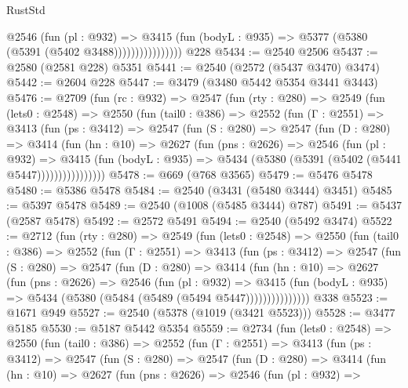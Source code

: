 \begin{lexlean}{RustStd}
\begin{coremodule}
                        @2546
                          (fun (pl : @932) =>
                          @3415
                            (fun (bodyL : @935) => @5377 (@5380 (@5391 (@5402 @3488))))))))))))))))
    @228
@5434 := @2540 @2506
@5437 := @2580 (@2581 @228) @5351
@5441 := @2540 (@2572 (@5437 @3470) @3474)
@5442 := @2604 @228
@5447 := @3479 (@3480 @5442 @5354 @3441 @3443)
@5476 := @2709
    (fun (rc : @932) =>
    @2547
      (fun (rty : @280) =>
      @2549
        (fun (lets0 : @2548) =>
        @2550
          (fun (tail0 : @386) =>
          @2552
            (fun (Γ : @2551) =>
            @3413
              (fun (ps : @3412) =>
              @2547
                (fun (S : @280) =>
                @2547
                  (fun (D : @280) =>
                  @3414
                    (fun (hn : @10) =>
                    @2627
                      (fun (pns : @2626) =>
                      @2546
                        (fun (pl : @932) =>
                        @3415
                          (fun (bodyL : @935) =>
                          @5434 (@5380 (@5391 (@5402 (@5441 @5447))))))))))))))))
@5478 := @669 (@768 @3565)
@5479 := @5476 @5478
@5480 := @5386 @5478
@5484 := @2540 (@3431 (@5480 @3444) @3451)
@5485 := @5397 @5478
@5489 := @2540 (@1008 (@5485 @3444) @787)
@5491 := @5437 (@2587 @5478)
@5492 := @2572 @5491
@5494 := @2540 (@5492 @3474)
@5522 := @2712
    (fun (rty : @280) =>
    @2549
      (fun (lets0 : @2548) =>
      @2550
        (fun (tail0 : @386) =>
        @2552
          (fun (Γ : @2551) =>
          @3413
            (fun (ps : @3412) =>
            @2547
              (fun (S : @280) =>
              @2547
                (fun (D : @280) =>
                @3414
                  (fun (hn : @10) =>
                  @2627
                    (fun (pns : @2626) =>
                    @2546
                      (fun (pl : @932) =>
                      @3415
                        (fun (bodyL : @935) =>
                        @5434 (@5380 (@5484 (@5489 (@5494 @5447)))))))))))))))
    @338
@5523 := @1671 @949
@5527 := @2540 (@5378 (@1019 (@3421 @5523)))
@5528 := @3477 @5185
@5530 := @5187 @5442 @5354
@5559 := @2734
    (fun (lets0 : @2548) =>
    @2550
      (fun (tail0 : @386) =>
      @2552
        (fun (Γ : @2551) =>
        @3413
          (fun (ps : @3412) =>
          @2547
            (fun (S : @280) =>
            @2547
              (fun (D : @280) =>
              @3414
                (fun (hn : @10) =>
                @2627
                  (fun (pns : @2626) =>
                  @2546
                    (fun (pl : @932) =>

\end{coremodule}
\end{lexlean}

